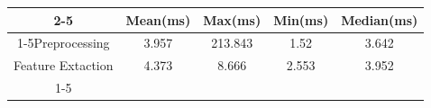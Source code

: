 \documentclass{standalone}
\begin{document}
 
 \begin{tabular}{|c |c |c |c |c |}
\cline{2-5}\cline{2-5} \multicolumn{1}{c |}{ } & Mean(ms) & Max(ms) & Min(ms) & Median(ms)\\ 
\cline{1-5}Preprocessing & 3.957 & 213.843 & 1.52 & 3.642\\ 
 \hhline{|=|=|=|=|=|}Feature Extaction & 4.373 & 8.666 & 2.553 & 3.952\\ 
 \cline{1-5}\hline \end{tabular}
 
\end{document}
